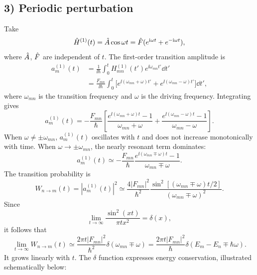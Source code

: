 \subsection*{3) Periodic perturbation}
Take
\begin{equation}
 \hat{H}^{(1)}(t)=\hat{A}\cos\omega t
 =\hat{F}(e^{\mathrm{i}\omega t}+e^{-\mathrm{i}\omega t}),
\end{equation}
where $\hat{A}$, $\hat{F}$ are independent of $t$. The first-order transition amplitude is
\begin{equation}\begin{aligned}
 a_m^{(1)}(t)
 &=\frac1{\ii\hbar}\int_0^t H_{mn}^{(1)}(t')e^{\ii\omega_{mn}t'}\dd t'\\
 &=\frac{F_{mn}}{\ii\hbar}\int_0^t
 \bigl[e^{\ii(\omega_{mn}+\omega)t'}
 +e^{\ii(\omega_{mn}-\omega)t'}\bigr]\dd t',
\end{aligned}\end{equation}
where $\omega_{mn}$ is the transition frequency and $\omega$ is the driving frequency. Integrating gives
\begin{equation}
 a_m^{(1)}(t)=-\frac{F_{mn}}{\hbar}\left[
 \frac{e^{\ii(\omega_{mn}+\omega)t}-1}{\omega_{mn}+\omega}
 +\frac{e^{\ii(\omega_{mn}-\omega)t}-1}{\omega_{mn}-\omega}
 \right].
\end{equation}
When $\omega\ne\pm\omega_{mn}$, $a_m^{(1)}(t)$ oscillates with $t$ and does not increase monotonically with time. When $\omega\to\pm\omega_{mn}$, the nearly resonant term dominates:
\begin{equation}
 a_m^{(1)}(t)\simeq-\frac{F_{mn}}{\hbar}
 \frac{e^{\ii(\omega_{mn}\mp\omega)t}-1}{\omega_{mn}\mp\omega}.
\end{equation}
The transition probability is
\begin{equation}
 W_{n\to m}(t)=|a_m^{(1)}(t)|^2
 \simeq\frac{4|F_{mn}|^2}{\hbar^2}
 \frac{\sin^2[(\omega_{mn}\mp\omega)t/2]}{(\omega_{mn}\mp\omega)^2}.
\end{equation}
Since
\begin{equation}
 \lim_{t\to\infty}\frac{\sin^2(xt)}{\pi t x^2}=\delta(x),
\end{equation}
it follows that
\begin{equation}
 \lim_{t\to\infty}W_{n\to m}(t)
 \simeq\frac{2\pi t|F_{mn}|^2}{\hbar^2}
 \delta(\omega_{mn}\mp\omega)
 =\frac{2\pi t|F_{mn}|^2}{\hbar}
 \delta(E_m-E_n\mp\hbar\omega).
\end{equation}
It grows linearly with $t$. The $\delta$ function expresses energy conservation, illustrated schematically below:
\begin{center}
\end{center}
